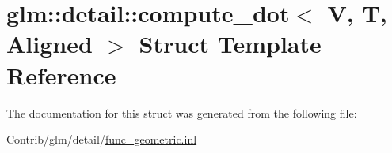 \hypertarget{structglm_1_1detail_1_1compute__dot}{}\section{glm\+:\+:detail\+:\+:compute\+\_\+dot$<$ V, T, Aligned $>$ Struct Template Reference}
\label{structglm_1_1detail_1_1compute__dot}


The documentation for this struct was generated from the following file\+:\begin{DoxyCompactItemize}
\item 
Contrib/glm/detail/\mbox{\hyperlink{func__geometric_8inl}{func\+\_\+geometric.\+inl}}\end{DoxyCompactItemize}
